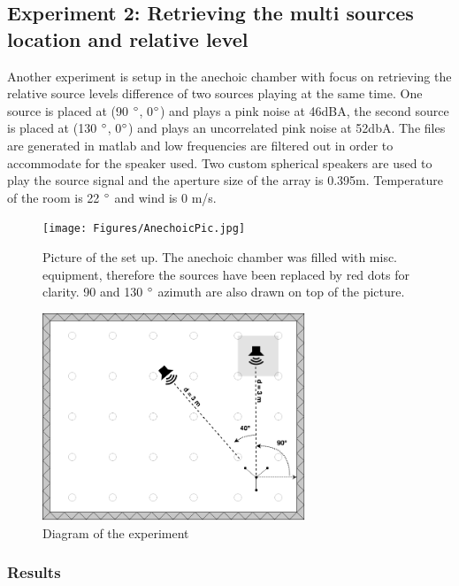 \newpage
\subsection{Experiment 2: Retrieving the multi sources location and relative level}

Another experiment is setup in the anechoic chamber with focus on retrieving the relative source levels difference of two sources playing at the same time. One source is placed at (90 $\degree$, 0$\degree$) and plays a pink noise at 46dBA, the second source is placed at (130 $\degree$, 0$\degree$) and plays an uncorrelated pink noise at 52dbA. The files are generated in matlab and low frequencies are filtered out in order to accommodate for the speaker used. Two custom spherical speakers are used to play the source signal and the aperture size of the array is 0.395m. Temperature of the room is 22 $\degree$ and wind is 0 m/s.

\begin{figure}[H]
    \centering
    \texttt{[image: Figures/AnechoicPic.jpg]}
    \caption{Picture of the set up. The anechoic chamber was filled with misc. equipment, therefore the sources have been replaced by red dots for clarity. 90 and 130 $\degree$ azimuth are also drawn on top of the picture.}
    \label{fig:Anechoicpic1}
\end{figure}

\begin{figure}[H]
    \centering
    \includegraphics[width=0.7\textwidth]{Figures/Anechoicexp3.png}
    \caption{Diagram of the experiment}
    \label{fig:Anechoicexp3}
\end{figure}

\subsubsection{Results}

